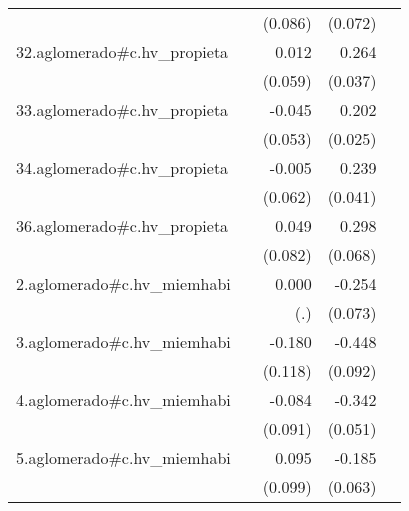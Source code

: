 {\begin{longtable}{l*{4}{D{.}{.}{-1}}}
            &                     &     (0.086)         &     (0.072)         &                     \\
\addlinespace
32.aglomerado#c.hv\_propieta&                     &       0.012         &       0.264\sym{***}&                     \\
            &                     &     (0.059)         &     (0.037)         &                     \\
\addlinespace
33.aglomerado#c.hv\_propieta&                     &      -0.045         &       0.202\sym{***}&                     \\
            &                     &     (0.053)         &     (0.025)         &                     \\
\addlinespace
34.aglomerado#c.hv\_propieta&                     &      -0.005         &       0.239\sym{***}&                     \\
            &                     &     (0.062)         &     (0.041)         &                     \\
\addlinespace
36.aglomerado#c.hv\_propieta&                     &       0.049         &       0.298\sym{***}&                     \\
            &                     &     (0.082)         &     (0.068)         &                     \\
\addlinespace
2.aglomerado#c.hv\_miemhabi&                     &       0.000         &      -0.254\sym{***}&                     \\
            &                     &         (.)         &     (0.073)         &                     \\
\addlinespace
3.aglomerado#c.hv\_miemhabi&                     &      -0.180         &      -0.448\sym{***}&                     \\
            &                     &     (0.118)         &     (0.092)         &                     \\
\addlinespace
4.aglomerado#c.hv\_miemhabi&                     &      -0.084         &      -0.342\sym{***}&                     \\
            &                     &     (0.091)         &     (0.051)         &                     \\
\addlinespace
5.aglomerado#c.hv\_miemhabi&                     &       0.095         &      -0.185\sym{**} &                     \\
            &                     &     (0.099)         &     (0.063)         &                     \\

\end{longtable}}
